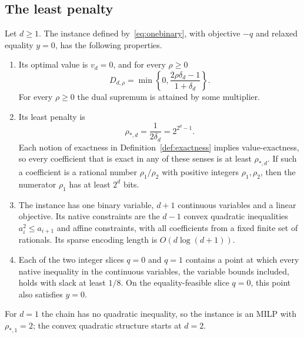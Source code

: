 \subsection{The least penalty}
\begin{theorem}\label{thm:lower}
Let $d\ge1$. The instance defined by~\eqref{eq:onebinary}, with objective
$-q$ and relaxed equality $y=0$, has the following properties.
\begin{enumerate}
\item[(a)] Its optimal value is $v_d=0$, and for every $\rho\ge0$
\begin{equation}\label{eq:dualformula}
 D_{d,\rho}=\min\left\{0,\frac{2\rho\delta_d-1}{1+\delta_d}\right\}.
\end{equation}
For every $\rho\ge0$ the dual supremum is attained by some multiplier.
\item[(b)] Its least penalty is
\begin{equation}\label{eq:lowerthreshold}
 \rho_{*,d}=\frac1{2\delta_d}=2^{2^d-1}.
\end{equation}
Each notion of exactness in Definition~\ref{def:exactness} implies
value-exactness, so every coefficient that is exact in any of these senses
is at least $\rho_{*,d}$. If such a coefficient is a rational number
$\rho_1/\rho_2$ with positive integers $\rho_1,\rho_2$, then the numerator
$\rho_1$ has at least $2^d$ bits.
\item[(c)] The instance has one binary variable, $d+1$ continuous
variables and a linear objective. Its native constraints are the $d-1$
convex quadratic inequalities $a_i^2\le a_{i+1}$ and affine constraints,
with all coefficients from a fixed finite set of rationals. Its sparse
encoding length is $O(d\log(d+1))$.
\item[(d)] Each of the two integer slices $q=0$ and $q=1$ contains a point
at which every native inequality in the continuous variables, the variable
bounds included, holds with slack at least $1/8$. On the
equality-feasible slice $q=0$, this point also satisfies $y=0$.
\end{enumerate}
\end{theorem}
For $d=1$ the chain has no quadratic inequality, so the instance is an
MILP with $\rho_{*,1}=2$; the convex quadratic structure starts at $d=2$.

